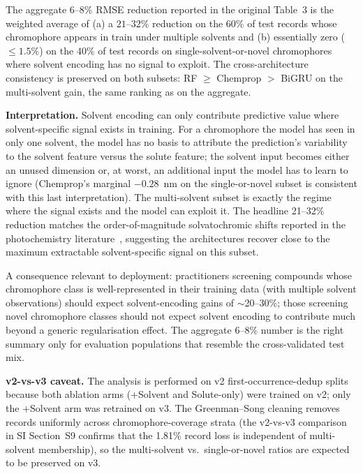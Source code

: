 \documentclass[11pt]{article}
\begin{document}
{The aggregate $6$--$8$\% RMSE reduction reported in the original Table~3 is the weighted average of (a) a $21$--$32$\% reduction on the $60$\% of test records whose chromophore appears in train under multiple solvents and (b) essentially zero ($\leq 1.5$\%) on the $40$\% of test records on single-solvent-or-novel chromophores where solvent encoding has no signal to exploit. The cross-architecture consistency is preserved on both subsets: RF $\geq$ Chemprop $>$ BiGRU on the multi-solvent gain, the same ranking as on the aggregate.

\textbf{Interpretation.} Solvent encoding can only contribute predictive value where solvent-specific signal exists in training. For a chromophore the model has seen in only one solvent, the model has no basis to attribute the prediction's variability to the solvent feature versus the solute feature; the solvent input becomes either an unused dimension or, at worst, an additional input the model has to learn to ignore (Chemprop's marginal $-0.28$~nm on the single-or-novel subset is consistent with this last interpretation). The multi-solvent subset is exactly the regime where the signal exists and the model can exploit it. The headline 21--32\% reduction matches the order-of-magnitude solvatochromic shifts reported in the photochemistry literature~\cite{reichardt2011solvents}, suggesting the architectures recover close to the maximum extractable solvent-specific signal on this subset.

A consequence relevant to deployment: practitioners screening compounds whose chromophore class is well-represented in their training data (with multiple solvent observations) should expect solvent-encoding gains of $\sim$20--30\%; those screening novel chromophore classes should not expect solvent encoding to contribute much beyond a generic regularisation effect. The aggregate $6$--$8$\% number is the right summary only for evaluation populations that resemble the cross-validated test mix.

\textbf{v2-vs-v3 caveat.} The analysis is performed on v2 first-occurrence-dedup splits because both ablation arms (+Solvent and Solute-only) were trained on v2; only the +Solvent arm was retrained on v3. The Greenman--Song cleaning removes records uniformly across chromophore-coverage strata (the v2-vs-v3 comparison in SI Section~S9 confirms that the 1.81\% record loss is independent of multi-solvent membership), so the multi-solvent vs.\ single-or-novel ratios are expected to be preserved on v3.}
\end{document}
